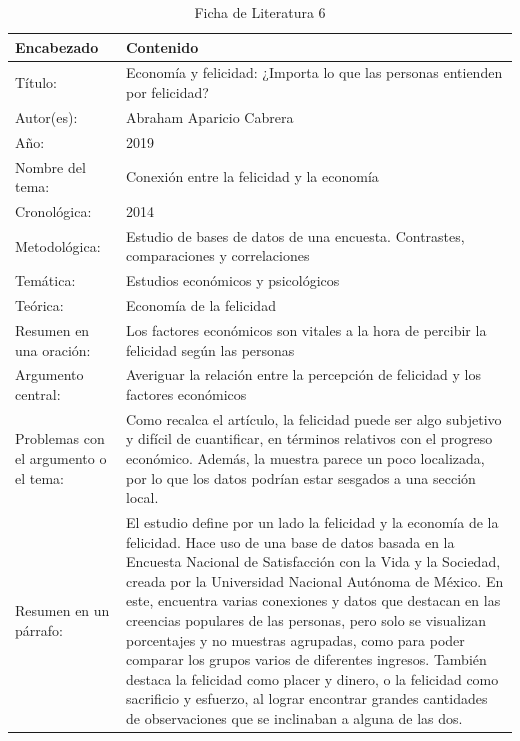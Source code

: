\begin{table}[H]
    \caption{Ficha de Literatura 6}
    \begin{center}
        \begin{tabular}{  m{3cm} | m{12cm}  }
        \hline\textbf{ Encabezado} & \textbf{Contenido }\\ \hline
        Título: &  Economía y felicidad: ¿Importa lo que las personas entienden por felicidad?\\ \hline
        Autor(es): & Abraham Aparicio Cabrera \\ \hline
        Año: &  2019\\ \hline
        Nombre del tema: & Conexión entre la felicidad y la economía \\ \hline
        Cronológica: & 2014 \\ \hline
        Metodológica: & Estudio de bases de datos de una encuesta. Contrastes, comparaciones y correlaciones  \\ \hline
        Temática: & Estudios económicos y psicológicos\\ \hline
        Teórica:  & Economía de la felicidad \\ \hline
        Resumen en una oración: & Los factores económicos son vitales a la hora de percibir la felicidad según las personas \\ \hline
        Argumento central: & Averiguar la relación entre la percepción de felicidad y los factores económicos \\ \hline
        Problemas con el argumento o el tema: & Como recalca el artículo, la felicidad puede ser algo subjetivo y difícil de cuantificar, en términos relativos con el progreso económico. Además, la muestra parece un poco localizada, por lo que los datos podrían estar sesgados a una sección local.  \\ \hline
        Resumen en un párrafo: & El estudio define por un lado la felicidad y la economía de la felicidad. Hace uso de una base de datos basada en la Encuesta Nacional de Satisfacción con la Vida y la Sociedad, creada por la Universidad Nacional Autónoma de México. En este, encuentra varias conexiones y datos que destacan en las creencias populares de las personas, pero solo se visualizan porcentajes y no muestras agrupadas, como para poder comparar los grupos varios de diferentes ingresos. También destaca la felicidad como placer y dinero, o la felicidad como sacrificio y esfuerzo, al lograr encontrar grandes cantidades de observaciones que se inclinaban a alguna de las dos.   \\ \hline
        \end{tabular}
    \end{center}
\end{table}


